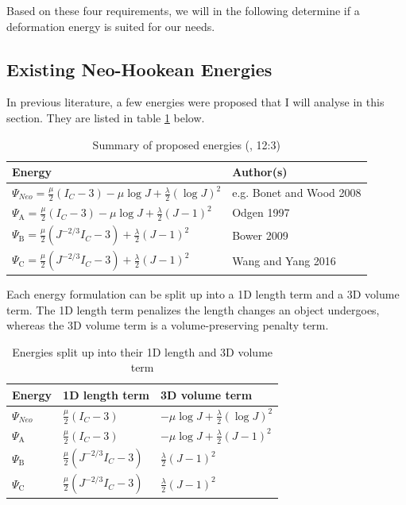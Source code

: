 Based on these four requirements, we will in the following determine if a deformation energy is suited for our needs.


\subsection{Existing Neo-Hookean Energies}

In previous literature, a few energies were proposed that I will analyse in this section. They are listed in table \ref{table:energies} below.

\begin{table}[!htbp]
\centering
    \begin{tabular}{ | l | l |}
    \hline
    \textbf{Energy} & \textbf{Author(s)} \\ \hline
    $\Psi_{Neo}=\frac{\mu}{2}\left(I_{C}-3\right)-\mu \log J+\frac{\lambda}{2}(\log J)^{2}$ & e.g. Bonet and Wood 2008 \\ \hline
    $\Psi_{\mathrm{A}}=\frac{\mu}{2}\left(I_{C}-3\right)-\mu \log J+\frac{\lambda}{2}(J-1)^{2}$ & Odgen 1997 \\ \hline
    $\Psi_{\mathrm{B}}=\frac{\mu}{2}\left(J^{-2 / 3} I_{C}-3\right)+\frac{\lambda}{2}(J-1)^{2}$ & Bower 2009 \\ \hline
    $\Psi_{\mathrm{C}}=\frac{\mu}{2}\left(J^{-2 / 3} I_{C}-3\right)+\frac{\lambda}{2}(J-1)^{2}$ & Wang and Yang 2016 \\ \hline
    \end{tabular}
    \caption{Summary of proposed energies (\cite{Smith:2018:SNF:3191713.3180491}, 12:3)}
\label{table:energies}
\end{table}

Each energy formulation can be split up into a 1D length term and a 3D volume term. The 1D length term penalizes the length changes an object undergoes, whereas the 3D volume term is a volume-preserving penalty term.

\begin{table}[!htbp]
\centering
    \begin{tabular}{ | l | l | l |}
    \hline
    \textbf{Energy} & \textbf{1D length term} & \textbf{3D volume term} \\ \hline
    $\Psi_{Neo}$ & $\frac{\mu}{2}\left(I_{C}-3\right)$ & $-\mu \log J+\frac{\lambda}{2}(\log J)^{2}$ \\ \hline
    $\Psi_{\mathrm{A}}$ & $\frac{\mu}{2}\left(I_{C}-3\right)$ & $-\mu \log J+\frac{\lambda}{2}(J-1)^{2}$ \\ \hline
    $\Psi_{\mathrm{B}}$ & $\frac{\mu}{2}\left(J^{-2 / 3} I_{C}-3\right)$ & $\frac{\lambda}{2}(J-1)^{2}$ \\ \hline
    $\Psi_{\mathrm{C}}$ & $\frac{\mu}{2}\left(J^{-2 / 3} I_{C}-3\right)$ & $\frac{\lambda}{2}(J-1)^{2}$ \\ \hline
    \end{tabular}
    \caption{Energies split up into their 1D length and 3D volume term}
\label{table:energies_split}
\end{table}

